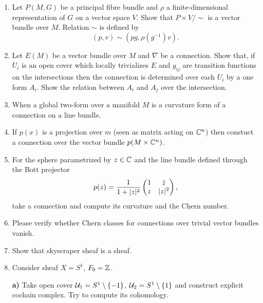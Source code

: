 \documentclass[a4paper,11pt]{article}
\begin{document}
\begin{enumerate}
\item Let $P( M, G )$ be a principal fibre bundle and $\rho$ a
  finite-dimensional representation of $G$ on a vector space $V$. Show
  that $P \times V / \sim$ is a vector bundle over $M$. Relation
  $\sim$ is defined by
  \begin{equation}
    \label{eq:DiffGeo-09}
    ( p, v ) \sim \left( pg, \rho\left( g^{ -1 } \right) v \right).
  \end{equation}

\item Let $E( M )$ be a vector bundle over $M$ and $\nabla$ be a
  connection. Show that, if $U_{ i }$ is an open cover which locally
  trivializes $E$ and $g_{ i j }$ are transition functions on the
  intersections then the connection is determined over each $U_{ i }$
  by a one form $A_{ i }$. Show the relation between $A_{ i }$ and
  $A_{ j }$ over the intersection.

\item When a global two-form over a manifold $M$ is a curvature form
  of a connection on a line bundle.

\item If $p( x )$ is a projection over $m$ (seen as matrix acting on
  $\mathbb{C}^{ n }$) then constuct a connection over the vector bundle
  $p( M \times \mathbb{C}^{ n } )$.

\item For the sphere parametrized by $z \in \mathbb{C}$ and the line bundle
  defined through the Bott projector
  \begin{equation}
    \label{eq:DiffGeo-10}
    p( z ) =
    \frac{ 1 }{ 1 + \lvert{  z  }\rvert^{ 2 } }
    \begin{pmatrix}
      1 & \bar{z} \\
      z & \lvert{  z  }\rvert^{ 2 }
    \end{pmatrix},
  \end{equation}
  take a connection and compute its curvature and the Chern number.

\item Please verify whether Chern classes for connections over trivial
  vector bundles vanish.

\item Show that skyscraper sheaf is a sheaf.

\item Consider sheaf $X = S^{ 1 }$, $F_{ 0 } = \mathbb{Z}$.

  \textbf{a)} Take open cover
  $\mathcal{U}_{ 1 } = S^{ 1 } \setminus \{ -1 \}$,
  $\mathcal{U}_{ 2 } = S^{ 1 } \setminus \{ 1 \}$ and construct explicit
  cochain complex. Try to compute its cohomology.


\end{enumerate}
\end{document}
